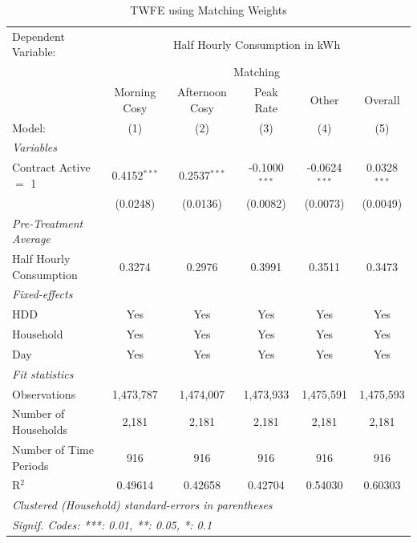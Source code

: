 
\begin{table}[htbp]
   \caption{\label{tab:did-matching} TWFE using Matching Weights}
   \centering
   \begin{tabular}{lccccc}
      \tabularnewline \midrule \midrule
      Dependent Variable: & \multicolumn{5}{c}{Half Hourly Consumption in kWh}\\
       & \multicolumn{5}{c}{Matching} \\ 
                                     & Morning Cosy   & Afternoon Cosy & Peak Rate       & Other           & Overall \\   
      Model:                         & (1)            & (2)            & (3)             & (4)             & (5)\\  
      \midrule
      \emph{Variables}\\
      Contract Active $=$ 1          & 0.4152$^{***}$ & 0.2537$^{***}$ & -0.1000$^{***}$ & -0.0624$^{***}$ & 0.0328$^{***}$\\   
                                     & (0.0248)       & (0.0136)       & (0.0082)        & (0.0073)        & (0.0049)\\   
\midrule
\emph{Pre-Treatment Average}\\
      Half Hourly Consumption        & 0.3274         & 0.2976         & 0.3991          & 0.3511          & 0.3473\\  
      \midrule
      \emph{Fixed-effects}\\
      HDD                            & Yes            & Yes            & Yes             & Yes             & Yes\\  
      Household                      & Yes            & Yes            & Yes             & Yes             & Yes\\  
      Day                            & Yes            & Yes            & Yes             & Yes             & Yes\\  
      \midrule
      \emph{Fit statistics}\\
      Observations                   & 1,473,787      & 1,474,007      & 1,473,933       & 1,475,591       & 1,475,593\\  
      Number of Households & 2,181          & 2,181          & 2,181           & 2,181           & 2,181\\  
      Number of Time Periods         & 916            & 916            & 916             & 916             & 916\\  
      R$^2$                          & 0.49614        & 0.42658        & 0.42704         & 0.54030         & 0.60303\\  
      \midrule \midrule
      \multicolumn{6}{l}{\emph{Clustered (Household) standard-errors in parentheses}}\\
      \multicolumn{6}{l}{\emph{Signif. Codes: ***: 0.01, **: 0.05, *: 0.1}}\\
   \end{tabular}
\end{table}


